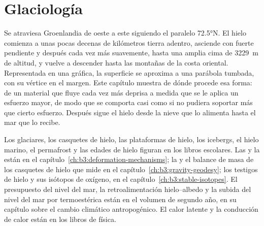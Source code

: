 \chapter{Glaciología}\label{ch:b3:glaciology}

Se atraviesa Groenlandia de oeste a este siguiendo el paralelo \ang{72.5}N. El hielo
comienza a unas pocas decenas de kilómetros tierra adentro, asciende con fuerte pendiente y después cada vez más suavemente,
hasta una amplia cima de \qty{3229}{m} de altitud, y vuelve a descender hasta las montañas de la
costa oriental. Representada en una gráfica, la superficie se aproxima a una parábola tumbada,
con su vértice en el margen. Este capítulo muestra de dónde procede esa forma: de un material
que fluye cada vez más deprisa a medida que se le aplica un esfuerzo mayor, de modo que se
comporta casi como si no pudiera soportar más que cierto esfuerzo.
Después sigue el hielo desde la nieve que lo alimenta hasta el mar
que lo recibe.

\begin{recall}
Los glaciares, los casquetes de hielo, las plataformas de hielo, los icebergs, el hielo marino,
el permafrost y las edades de hielo figuran en los libros escolares. Las  y la  están en
el capítulo~\ref{ch:b3:deformation-mechanisms}; la  y el balance de masa
de los casquetes de hielo que mide en el capítulo~\ref{ch:b3:gravity-geodesy};
los testigos de hielo y sus isótopos de oxígeno, en el capítulo~\ref{ch:b3:stable-isotopes}.
El presupuesto del nivel del mar, la retroalimentación hielo--albedo y la subida del nivel
del mar por termoestérica están en el volumen de segundo año, en su capítulo sobre el cambio
climático antropogénico. El calor latente y la conducción de calor están en los libros de física.
\end{recall}

